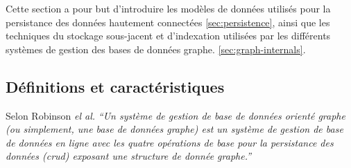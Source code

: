 Cette section a pour but d'introduire les modèles de données utilisés
pour la persistance des données hautement connectées
\ref{sec:persistence}, ainsi que les techniques du stockage
sous-jacent et d'indexation utilisées par les différents systèmes de
gestion des bases de données graphe.
\ref{sec:graph-internals}.\medskip

  \subsection{Définitions et caractéristiques}
  \label{sec:graphdb-defs}

  Selon Robinson \emph{el al.} \cite{robinson2013graph} \textit{``Un
    système de gestion de base de données orienté graphe (ou
    simplement, une base de données graphe) est un système de gestion
    de base de données en ligne avec les quatre
    opérations de base pour la persistance des données
    (\acrshort{crud}) exposant une structure de donnée
    graphe.''}\bigskip

